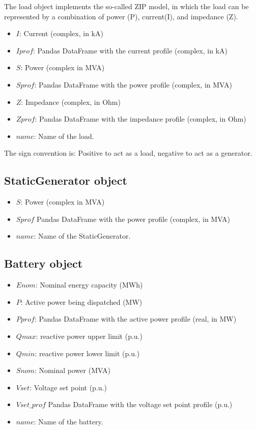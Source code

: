 \documentclass[11pt,fleqn]{book} %
\begin{document}
The load object implements the so-called ZIP model, in which the load can be represented by a combination of power (P), current(I), and impedance (Z).

\begin{itemize}
	\item $I$: Current (complex, in kA)
	\item $Iprof$: Pandas DataFrame with the current profile (complex, in kA)
	\item $S$: Power (complex in MVA)
	\item $Sprof$: Pandas DataFrame with the power profile (complex, in MVA)
	\item $Z$: Impedance (complex, in Ohm)
	\item $Zprof$: Pandas DataFrame with the impedance profile (complex, in Ohm)
	\item $name$: Name of the load.
\end{itemize}

The sign convention is: Positive to act as a load, negative to act as a generator.

\subsection{StaticGenerator object}

\begin{itemize}
	\item $S$: Power (complex in MVA)
	\item $Sprof$ Pandas DataFrame with the power profile (complex, in MVA)
	\item $name$: Name of the StaticGenerator.
\end{itemize}




\subsection{Battery object}

\begin{itemize}
	\item $Enom$: Nominal energy capacity (MWh)
	\item $P$: Active power being dispatched (MW)
	\item $Pprof$: Pandas DataFrame with the active power profile (real, in MW)
	\item $Qmax$: reactive power upper limit (p.u.)
	\item $Qmin$: reactive power lower limit (p.u.)
	\item $Snom$: Nominal power (MVA)
	\item $Vset$: Voltage set point (p.u.)
	\item $Vset\_prof$ Pandas DataFrame with the voltage set point profile (p.u.)
	\item $name$: Name of the battery.
\end{itemize}
\end{document}
